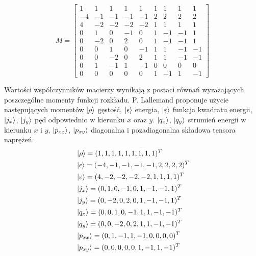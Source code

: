 \documentclass[a4paper,11pt,twoside]{article}
\begin{document}
\begin{equation}
M = 
\begin{bmatrix}
			1 & 1 & 1 & 1 & 1 & 1 & 1 & 1 & 1	\\
			-4 & -1 & -1 & -1 & -1 & 2 & 2 & 2 & 2	\\
			4 & -2 &-2 & -2 & -2 & 1 & 1 & 1 & 1	\\
			0 & 1 & 0 & -1 & 0 & 1 & -1 & -1 & 1	\\
			0 & -2 & 0 & 2 & 0 & 1 & -1 & -1 & 1	\\
			0 &  0 & 1 & 0 & -1 & 1 & 1 &-1 & -1	\\
            0 & 0 & -2 & 0 & 2 & 1 & 1 & -1 & -1	\\
			0 & 1 & -1 & 1 & -1 & 0 & 0 & 0 & 0	\\
			0 & 0 & 0 & 0 & 0 & 1 & -1 & 1 & -1
\end{bmatrix}
\end{equation}
            
Wartości współczynników macierzy wynikają z postaci równań wyrażających poszczególne momenty funkcji rozkładu. P. Lallemand \cite{MRT} proponuje użycie następujących momentów $\ket{\rho} $ gęstość,  $\ket{\epsilon}$ energia, $\ket{\varepsilon}$ funkcja kwadratu energii, $\ket{j_x}$, $\ket{j_y}$ pęd odpowiednio w kierunku $x$ oraz $y$. $\ket{q_x}$, $\ket{q_y}$ strumień energii w kierunku $x$ i $y$, $\ket{p_{xx}}$, $\ket{p_{xy}}$ diagonalna i pozadiagonalna składowa tensora naprężeń.
\begin{eqnarray}
&\ket{\rho} = (1, 1, 1, 1, 1, 1, 1, 1, 1)^T		\\
&\ket{\epsilon} = (-4, -1 , -1 , -1 , -1 , 2 , 2 , 2 , 2)^T\\
&\ket{\varepsilon} =(4 , -2 ,-2 , -2 , -2 , 1 , 1 , 1 , 1)^T 	\\
&\ket{j_x} = (0 , 1 , 0 , -1 , 0 , 1 , -1 , -1 , 1)^T \\
&\ket{j_y} = (0 , -2 , 0 , 2 , 0 , 1 , -1 , -1 , 1)^T\\
&\ket{q_x} = (0 ,  0 , 1 , 0 , -1 , 1 , 1 ,-1 , -1)^T \\
&\ket{q_y} = (0 , 0 , -2 , 0 , 2 , 1 , 1 , -1 , -1)^T \\ 
&\ket{p_{xx}} =(0 , 1 , -1 , 1 , -1 , 0 , 0 , 0 , 0)^T \\ 
&\ket{p_{xy}} = (0 , 0 , 0 , 0 , 0 , 1 , -1 , 1 , -1)^T
\end{eqnarray}
\end{document}
